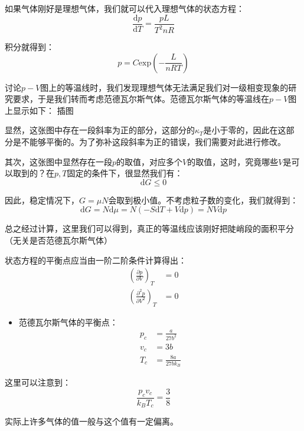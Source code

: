 \documentclass[a4paper, 10pt, openany]{book}%
\begin{document}
如果气体刚好是理想气体，我们就可以代入理想气体的状态方程：
\begin{equation}
  \frac{\mathrm{d}p}{\mathrm{d}T}=\frac{pL}{T^2 nR}
\end{equation}

积分就得到：
\begin{equation}
p=C\mathrm{exp}({-\frac{L}{nRT}})
\end{equation}

讨论$p-V$图上的等温线时，我们发现理想气体无法满足我们对一级相变现象的研究要求，于是我们转而考虑范德瓦尔斯气体。范德瓦尔斯气体的等温线在$p-V$图上显示如下：
插图

显然，这张图中存在一段斜率为正的部分，这部分的$\kappa_T$是小于零的，因此在这部分是不能够平衡的。为了弥补这段斜率为正的错误，我们需要对此进行修改。

其次，这张图中显然存在一段$p$的取值，对应多个$V$的取值，这时，究竟哪些$V$是可以取到的？在$p,T$固定的条件下，很显然我们有：
\begin{equation}
\mathrm{d}G\leq0
\end{equation}

因此，稳定情况下，$G=\mu N$会取到极小值。不考虑粒子数的变化，我们就得到：
\begin{equation}
\mathrm{d}G=N\mathrm{d}\mu=N(-S\mathrm{d}T+V\mathrm{d}p)=NV\mathrm{d}p
\end{equation}

总之经过计算，这里我们可以得到，真正的等温线应该刚好把陡峭段的面积平分（无关是否范德瓦尔斯气体）

状态方程的平衡点应当由一阶二阶条件计算得出：
\begin{align}
\left(\frac{\partial p}{\partial V}\right)_T&=0\\
\left(\frac{\partial^2 p}{\partial V^2}\right)_T&=0
\end{align}
\begin{itemize}
\item 范德瓦尔斯气体的平衡点：
\begin{align}
p_c&=\frac{a}{27b^2}\\
v_c&=3b\\
T_c&=\frac{8a}{27bk_B}
\end{align}
\end{itemize}

这里可以注意到：
\begin{equation}
\frac{p_cv_c}{k_BT_c}=\frac{3}{8}
\end{equation}

实际上许多气体的值一般与这个值有一定偏离。
\end{document}
